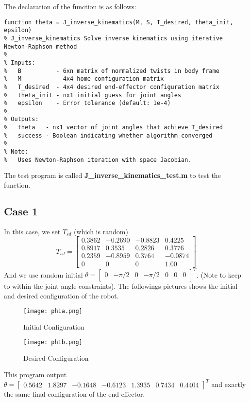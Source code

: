 \documentclass[english,10pt,a4paper]{article}
\begin{document}
    The declaration of the function is as follows:
    \begin{lstlisting}[style=matlab]
function theta = J_inverse_kinematics(M, S, T_desired, theta_init, epsilon)
% J_inverse_kinematics Solve inverse kinematics using iterative Newton-Raphson method
%
% Inputs:
%   B          - 6xn matrix of normalized twists in body frame
%   M          - 4x4 home configuration matrix
%   T_desired  - 4x4 desired end-effector configuration matrix
%   theta_init - nx1 initial guess for joint angles
%   epsilon    - Error tolerance (default: 1e-4)
%
% Outputs:
%   theta   - nx1 vector of joint angles that achieve T_desired
%   success - Boolean indicating whether algorithm converged
%
% Note:
%   Uses Newton-Raphson iteration with space Jacobian.
    \end{lstlisting}
    The test program is called \textbf{J\_inverse\_kinematics\_test.m} to test the function.
    \subsection*{Case 1}
    In this case, we set $T_{sd}$ (which is random)
    \begin{equation}
        T_{sd} = \begin{bmatrix}
            0.3862 & -0.2690 & -0.8823 & 0.4225\\
            0.8917 & 0.3535 & 0.2826 & 0.3776\\
            0.2359 & -0.8959 & 0.3764 &  -0.0874\\
            0 & 0 & 0 & 1.00
        \end{bmatrix}
    \end{equation}
    And we use random initial \(\theta = \begin{bmatrix}
        0 & -\pi/2 & 0 & -\pi/2 & 0 & 0 & 0 \end{bmatrix}^T\). (Note to keep to within the joint angle constraints). The followings pictures shows the initial and desired configuration of the robot.
    \begin{figure}[H]
        \centering
        \begin{minipage}{0.45\textwidth}
            \centering
            \texttt{[image: ph1a.png]} %
            \caption{Initial Configuration}
            \label{fig:ph1a}
        \end{minipage}
        \hfill
        \begin{minipage}{0.45\textwidth}
        \centering
            \texttt{[image: ph1b.png]} %
            \caption{Desired Configuration}
            \label{fig:ph1b}
        \end{minipage}
    \end{figure}
    This program output \(\theta = \begin{bmatrix} 0.5642 & 1.8297 & -0.1648 & -0.6123 & 1.3935 & 0.7434 & 0.4404 \end{bmatrix}^T\) and exactly the same final configuration of the end-effector.
    
\end{document}
